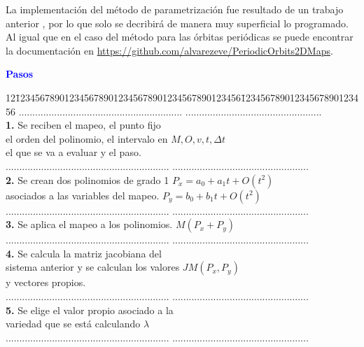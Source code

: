 La implementaci\'on del m\'etodo de parametrizaci\'on fue resultado de un trabajo anterior \cite{eve}, por lo que solo se decribir\'a de manera muy superficial lo programado. Al igual que en el caso del m\'etodo para las \'orbitas peri\'odicas se puede encontrar la documentaci\'on en  \url{https://github.com/alvarezeve/PeriodicOrbits2DMaps}. 

\begin{center}
	\textcolor{blue}{\textbf{Pasos}}
	\begin{tabbing}
		12\=1234567890123456789012345678901234567890123456\=12345678901234567890123456\kill%
		\>............................................................  \>..................................................\\
		\>\textbf{1.} Se reciben el mapeo, el punto fijo  \> \\
		\> el orden del polinomio, el intervalo en  \> $M, O, v, t, \Delta t$\\
		\> el que se va a evaluar y el paso.\> \\
		\>............................................................  \>..................................................\\
		\>\textbf{2.} Se crean dos polinomios de grado 1  \> $P_{x} = a_{0}+a_{1}t+O(t^{2})$\\
		\> asociados a las variables del mapeo. \>  $P_{y} = b_{0} +b_{1}t+O(t^{2})$ \\
		\>............................................................  \>..................................................\\
		\>\textbf{3.} Se aplica el mapeo a los polinomios.  \> $M(P_{x}+P_{y})$\\
		\>............................................................  \>..................................................\\
		\>\textbf{4.} Se calcula la matriz jacobiana del  \> \\
		\>sistema anterior y se calculan los valores \> $JM(P_{x},P_{y})$\\
		\> y vectores propios.\\
		\>............................................................  \>..................................................\\
		\>\textbf{5.} Se elige el valor propio asociado a la  \> \\
		\>variedad que se está calculando \> $\lambda$\\
		\>............................................................  \>..................................................\\

\end{tabbing}
\end{center}
